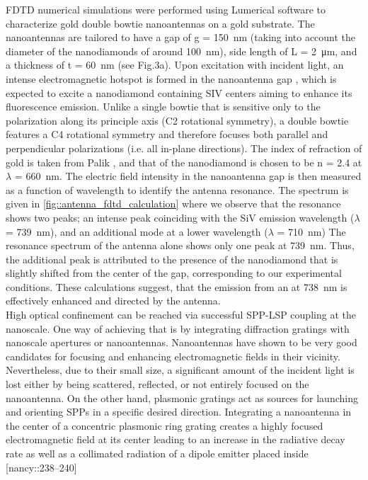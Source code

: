 		FDTD numerical simulations were performed using Lumerical software to characterize gold double bowtie nanoantennas on a gold substrate. The nanoantennas are tailored to have a gap of g = \SI{150}{nm} (taking into account the diameter of the nanodiamonds of around \SI{100}{nm}), side length of L = \SI{2}{\micro\meter}, and a thickness of t = \SI{60}{nm} (see Fig.3a).
		Upon excitation with incident light, an intense electromagnetic hotspot is formed in the nanoantenna gap \cite{Rahbany2015}, which is expected to excite a nanodiamond containing SIV centers aiming to enhance its fluorescence emission.
		Unlike a single bowtie that is sensitive only to the polarization along its principle axis (C2 rotational symmetry), a double bowtie features a C4 rotational symmetry and therefore focuses both parallel and perpendicular polarizations (i.e. all in-plane directions).
		The index of refraction of gold is taken from Palik \cite{}, and that of the nanodiamond is chosen to be n = 2.4 at $\lambda$ = \SI{660}{nm}.
		The electric field intensity in the nanoantenna gap is then measured as a function of wavelength to identify the antenna resonance.
		The spectrum is given in \cref{fig::antenna_fdtd_calculation} where we observe that the resonance shows two peaks; an intense peak coinciding with the SiV emission wavelength ($\lambda$ = \SI{739}{nm}), and an additional mode at a lower wavelength ($\lambda$ = \SI{710}{nm}) \cite{Rahbany2016}
		The resonance spectrum of the antenna alone shows only one peak at \SI{739}{nm}.
		Thus, the additional peak is attributed to the presence of the nanodiamond that is slightly shifted from the center of the gap, corresponding to our experimental conditions.
		These calculations suggest, that the emission from an \siv at \SI{738}{nm} is effectively enhanced and directed by the antenna.
		\\
		High optical confinement can be reached via successful SPP-LSP coupling at the nanoscale. One way of achieving that is by integrating diffraction gratings with nanoscale apertures or nanoantennas. Nanoantennas have shown to be very good candidates for focusing and enhancing electromagnetic fields in their vicinity. Nevertheless, due to their small size, a significant amount of the incident light is lost either by being scattered, reflected, or not entirely focused on the nanoantenna. On the other hand, plasmonic gratings act as sources for launching and orienting SPPs in a specific desired direction. Integrating a nanoantenna in the center of a concentric plasmonic ring grating creates a highly focused electromagnetic field at its center leading to an increase in the radiative decay rate as well as a collimated radiation of a dipole emitter placed inside [nancy::238–240]

